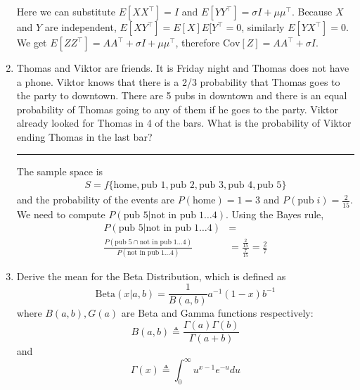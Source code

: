 \documentclass[12pt]{article}
\begin{document}
\begin{enumerate}
    Here we can substitute $E[XX^\intercal ] = I$ and $E[Y Y^\intercal ] = \sigma I+\mu\mu^\intercal $. Because $X$ and $Y$ are independent, $E[XY^\intercal ] = E[X]E[Y^\intercal = 0$, similarly $E[Y X^\intercal ] = 0$. We get $E[ZZ^\intercal ] = AA^\intercal  + \sigma I + \mu\mu^\intercal $, therefore $\textrm{Cov}[Z] = AA^\intercal  + \sigma I$.
    
    \item Thomas and Viktor are friends. It is Friday night and Thomas does not have a phone. Viktor knows that there is a 2/3 probability that Thomas goes to the party to downtown. 
          There are 5 pubs in downtown and there is an equal probability of Thomas going to any of them if he goes to the party. Viktor already looked for Thomas in 4 of the bars. 
          What is the probability of Viktor ending Thomas in the last bar? 
    
    \noindent\rule{\linewidth}{1pt}

    The sample space is
    \begin{align*}
        S = f\{\textrm{home}, \textrm{pub 1}, \textrm{pub 2}, \textrm{pub 3}, \textrm{pub 4}, \textrm{pub 5}\}
    \end{align*}
    and the probability of the events are $P(\textrm{home}) = 1=3$ and $P(\textrm{pub} \; i) = \frac{2}{15}$. We need to compute $P(\textrm{pub 5}|\textrm{not in pub} \; 1 \dots 4)$.
    Using the Bayes rule,
    \begin{align*}
        P(\textrm{pub 5}|\textrm{not in pub} \; 1 \dots 4) &=\\
        \frac{P(\textrm{pub 5} \cap \textrm{not in pub} \; 1 \dots 4)}{P(\textrm{not in pub} \; 1 \dots 4)} &= \frac{\frac{2}{15}}{\frac{7}{15}} = \frac{2}{7}
    \end{align*}    

    \item Derive the mean for the Beta Distribution, which is defined as 
    \begin{equation}
        \textrm{Beta}(x|a, b)= \frac{1}{B(a, b) } a^{-1}(1 - x)b^{-1} 
    \end{equation}
    where $B(a, b), G(a)$ are Beta and Gamma functions respectively: 
    \begin{equation}
        B(a, b) \triangleq \frac{\Gamma(a)\Gamma(b)}{\Gamma(a + b) }
    \end{equation}
    and 
    \begin{equation}
        \Gamma(x) \triangleq \int_0^{\infty } u^{x-1} e^{-u} d u
    \end{equation}


\end{enumerate}
\end{document}
